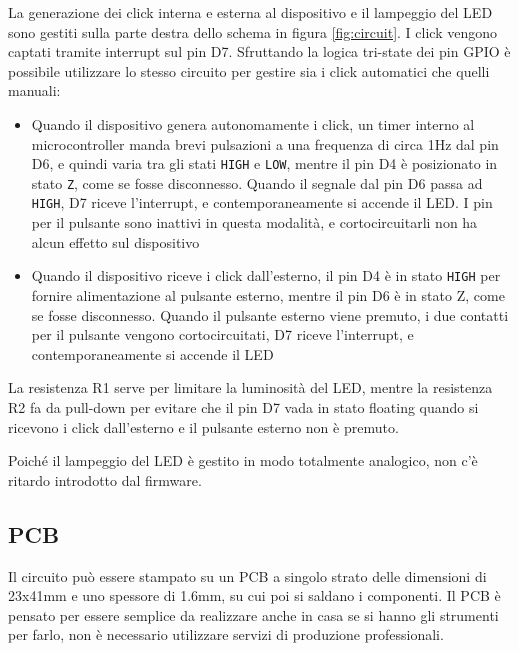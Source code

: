 La generazione dei click interna e esterna al dispositivo e il lampeggio del LED sono gestiti sulla parte destra dello schema in figura \ref{fig:circuit}. I click vengono captati tramite interrupt sul pin D7. Sfruttando la logica tri-state dei pin GPIO è possibile utilizzare lo stesso circuito per gestire sia i click automatici che quelli manuali:
\begin{itemize}
	\item Quando il dispositivo genera autonomamente i click, un timer interno al microcontroller manda brevi pulsazioni a una frequenza di circa 1Hz dal pin D6, e quindi varia tra gli stati \texttt{HIGH} e \texttt{LOW}, mentre il pin D4 è posizionato in stato \texttt{Z}, come se fosse disconnesso. Quando il segnale dal pin D6 passa ad \texttt{HIGH}, D7 riceve l'interrupt, e contemporaneamente si accende il LED. I pin per il pulsante sono inattivi in questa modalità, e cortocircuitarli non ha alcun effetto sul dispositivo
	\item Quando il dispositivo riceve i click dall'esterno, il pin D4 è in stato \texttt{HIGH} per fornire alimentazione al pulsante esterno, mentre il pin D6 è in stato Z, come se fosse disconnesso. Quando il pulsante esterno viene premuto, i due contatti per il pulsante vengono cortocircuitati, D7 riceve l'interrupt, e contemporaneamente si accende il LED
\end{itemize}

La resistenza R1 serve per limitare la luminosità del LED, mentre la resistenza R2 fa da pull-down per evitare che il pin D7 vada in stato floating quando si ricevono i click dall'esterno e il pulsante esterno non è premuto.

Poiché il lampeggio del LED è gestito in modo totalmente analogico, non c'è ritardo introdotto dal firmware.

\subsection{PCB}
Il circuito può essere stampato su un PCB a singolo strato delle dimensioni di 23x41mm e uno spessore di 1.6mm, su cui poi si saldano i componenti. Il PCB è pensato per essere semplice da realizzare anche in casa se si hanno gli strumenti per farlo, non è necessario utilizzare servizi di produzione professionali.

